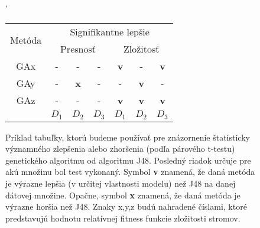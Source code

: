 \begin{figure}[h]
\catcode`
\centering 
\newcommand\T{\rule{0pt}{2.6ex}}       %
\newcommand\B{\rule[-1.2ex]{0pt}{0pt}} %
\begin{tabular}{|c||c c c|c c c||}
\hline
\hline \multirow{2}{*}{Metóda} & \multicolumn{6}{|c||}{Signifikantne lepšie} 
\\
\cline{2-7} & \multicolumn{3}{|c|}{Presnosť} & \multicolumn{3}{|c|}{Zložitosť} \\
\hline
\hline
GAx & - & - & - & \textbf{v} & - & \textbf{v} \\ \hline
GAy & - & \textbf{x} & - & - & \textbf{v} & - \\ \hline
GAz & - & - & - & \textbf{v} & \textbf{v} & \textbf{v} \\ \hline
 & $D_1$ & $D_2$ & $D_3$ & $D_1$ & $D_2$ & $D_3$ \\ \hline
\end{tabular}
\caption{Príklad tabuľky, ktorú budeme používať pre znázornenie štatisticky významného zlepšenia alebo zhoršenia (podľa párového t-testu) genetického algoritmu od algoritmu J48. Posledný riadok určuje pre akú množinu bol test vykonaný. Symbol \textbf{v} znamená, že daná metóda je výrazne lepšia (v určitej vlastnosti modelu) než J48 na danej dátovej množine. Opačne, symbol \textbf{x} znamená, že daná metóda je výrazne horšia než J48. Znaky x,y,z budú nahradené číslami, ktoré predstavujú hodnotu relatívnej fitness funkcie zložitosti stromov.}\label{fig:tab3}
\end{figure}

